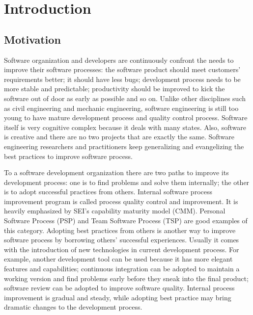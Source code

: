 \chapter{Introduction}
\label{chap:Intro}

\section{Motivation}
\label{sec:motivation}
Software organization and developers are continuously confront the needs to
improve their software processes: the software product should meet
customers' requirements better; it should have less bugs; development
process needs to be more stable and predictable; productivity should be
improved to kick the software out of door as early as possible and so on.
Unlike other disciplines such as civil engineering and mechanic
engineering, software engineering is still too young to have mature
development process and quality control process. Software itself is very
cognitive complex because it deals with many states. Also, software
is creative and there are no two projects that
are exactly the same. Software engineering researchers and practitioners
keep generalizing and evangelizing the best practices to improve software
process.

To a software development organization there are two paths to improve its
development process: one is to find problems and solve them internally; the
other is to adopt successful practices from others. Internal software
process improvement program is called process quality control and
improvement. It is heavily emphasized by SEI's capability maturity model
(CMM). Personal Software Process (PSP) and Team Software Process (TSP) are
good examples of this category.  Adopting best practices from others is
another way to improve software process by borrowing others' successful
experiences. Usually it comes with the introduction of new technologies in
current development process. For example, another development tool can be
used because it has more elegant features and capabilities; continuous
integration can be adopted to maintain a working version and find problems
early before they sneak into the final product; software review can be
adopted to improve software quality. Internal process improvement is
gradual and steady, while adopting best practice may bring dramatic changes
to the development process.


